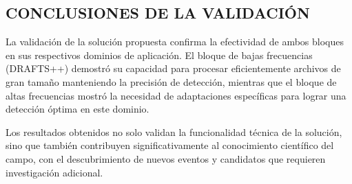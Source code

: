 \subsection{CONCLUSIONES DE LA VALIDACIÓN}

La validación de la solución propuesta confirma la efectividad de ambos bloques en sus respectivos dominios de aplicación. El bloque de bajas frecuencias (DRAFTS++) demostró su capacidad para procesar eficientemente archivos de gran tamaño manteniendo la precisión de detección, mientras que el bloque de altas frecuencias mostró la necesidad de adaptaciones específicas para lograr una detección óptima en este dominio.

Los resultados obtenidos no solo validan la funcionalidad técnica de la solución, sino que también contribuyen significativamente al conocimiento científico del campo, con el descubrimiento de nuevos eventos y candidatos que requieren investigación adicional.
